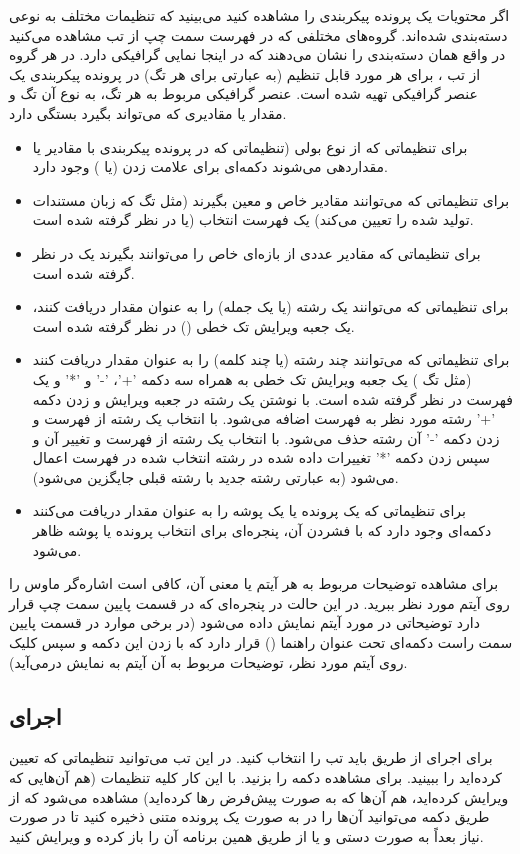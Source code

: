 اگر محتویات یک پرونده پیکربندی را مشاهده کنید می‌بینید که تنظیمات مختلف به نوعی دسته‌بندی شده‌اند. گروه‌های مختلفی که در 
فهرست سمت چپ از تب  مشاهده می‌کنید در واقع همان دسته‌بندی را نشان می‌دهند که در اینجا نمایی گرافیکی دارد. در 
هر گروه از تب ، برای هر مورد قابل تنظیم (به عبارتی برای هر تگ) در پرونده پیکربندی یک عنصر گرافیکی تهیه 
شده است. عنصر گرافیکی مربوط به هر تگ، به نوع آن تگ و  مقدار یا مقادیری که می‌تواند بگیرد بستگی دارد.
\begin{itemize}
 \item 
برای تنظیماتی که از نوع بولی (تنظیماتی که در پرونده پیکربندی با مقادیر  یا  مقداردهی می‌شوند دکمه‌ای 
برای علامت زدن (یا ) وجود دارد.
\item
برای تنظیماتی که می‌توانند مقادیر خاص و معین بگیرند (مثل تگ  که زبان مستندات تولید شده را 
تعیین می‌کند) یک فهرست انتخاب (یا  در نظر گرفته شده است.
\item
برای تنظیماتی که مقادیر عددی از بازه‌ای خاص را می‌توانند بگیرند یک  در نظر گرفته شده است.
\item
برای تنظیماتی که می‌توانند یک رشته (یا یک جمله) را به عنوان مقدار دریافت کنند، یک جعبه ویرایش تک 
خطی () در نظر گرفته شده است.
\item
برای تنظیماتی که می‌توانند چند رشته (یا چند کلمه) را به عنوان مقدار دریافت کنند (مثل تگ ) یک 
جعبه ویرایش تک خطی به همراه سه دکمه '+'، '-' و '*' و یک فهرست در نظر گرفته شده است. با نوشتن یک رشته در جعبه 
ویرایش و زدن دکمه '+' رشته مورد نظر به فهرست اضافه می‌شود. با انتخاب یک رشته از فهرست و زدن دکمه '-' آن رشته 
حذف می‌شود. با انتخاب یک رشته از فهرست و تغییر آن و سپس زدن دکمه '*' تغییرات داده شده در رشته انتخاب شده در فهرست 
اعمال می‌شود (به عبارتی رشته جدید با رشته قبلی جایگزین می‌شود).
\item
برای تنظیماتی که یک پرونده یا یک پوشه را به عنوان مقدار دریافت می‌کنند دکمه‌ای وجود دارد که با فشردن آن، پنجره‌ای 
برای انتخاب پرونده یا پوشه ظاهر می‌شود.
\end{itemize}

برای مشاهده توضیحات مربوط به هر آیتم یا معنی آن، کافی است اشاره‌گر ماوس را روی آیتم مورد نظر ببرید. در این حالت 
در پنجره‌ای که در قسمت پایین سمت چپ قرار دارد توضیحاتی در مورد آیتم نمایش داده می‌شود (در برخی موارد در قسمت پایین 
سمت راست دکمه‌ای تحت عنوان راهنما () قرار دارد که با زدن این دکمه و سپس کلیک روی آیتم مورد نظر، توضیحات 
مربوط به آن آیتم به نمایش درمی‌آید).
\subsection{اجرای }
برای اجرای  از طریق  باید تب  را انتخاب کنید. در این تب می‌توانید تنظیماتی 
که تعیین کرده‌اید را ببینید. برای مشاهده دکمه  را بزنید. با این کار کلیه تنظیمات (هم آن‌هایی 
که ویرایش کرده‌اید، هم آن‌ها که به صورت پیش‌فرض رها کرده‌اید) مشاهده می‌شود که از طریق دکمه  می‌توانید آن‌ها را 
در به صورت یک پرونده متنی ذخیره کنید تا در صورت نیاز بعداً به صورت دستی و یا از طریق همین برنامه  آن را 
باز کرده و ویرایش کنید.

